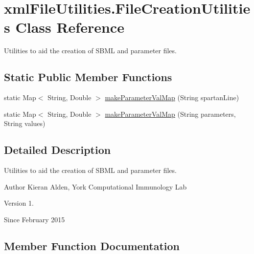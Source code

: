 \hypertarget{classxmlFileUtilities_1_1FileCreationUtilities}{}\section{xml\+File\+Utilities.\+File\+Creation\+Utilities Class Reference}
\label{classxmlFileUtilities_1_1FileCreationUtilities}


Utilities to aid the creation of S\+B\+M\+L and parameter files.  


\subsection*{Static Public Member Functions}
\begin{DoxyCompactItemize}
\item 
static Map$<$ String, Double $>$ \hyperlink{classxmlFileUtilities_1_1FileCreationUtilities_a4d2f50a15175705082e6f363e1ae67cb}{make\+Parameter\+Val\+Map} (String spartan\+Line)
\item 
static Map$<$ String, Double $>$ \hyperlink{classxmlFileUtilities_1_1FileCreationUtilities_a5bf928a92cb64bc495e8832597cb55ae}{make\+Parameter\+Val\+Map} (String parameters, String values)
\end{DoxyCompactItemize}


\subsection{Detailed Description}
Utilities to aid the creation of S\+B\+M\+L and parameter files. 

\begin{DoxyAuthor}{Author}
Kieran Alden, York Computational Immunology Lab 
\end{DoxyAuthor}
\begin{DoxyVersion}{Version}
1. 
\end{DoxyVersion}
\begin{DoxySince}{Since}
February 2015 
\end{DoxySince}


\subsection{Member Function Documentation}
\hypertarget{classxmlFileUtilities_1_1FileCreationUtilities_a4d2f50a15175705082e6f363e1ae67cb}{}
